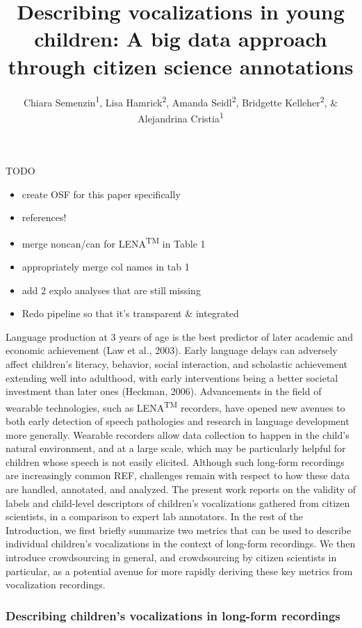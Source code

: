 \documentclass[english,,man,floatsintext]{apa6}
\author{Chiara Semenzin\textsuperscript{1}, Lisa Hamrick\textsuperscript{2}, Amanda Seidl\textsuperscript{2}, Bridgette Kelleher\textsuperscript{2}, \& Alejandrina Cristia\textsuperscript{1}}
\affiliation{
\vspace{0.5cm}
\textsuperscript{1} Laboratoire de Sciences Cognitives et de Psycholinguistique, Département d'Etudes cognitives, ENS, EHESS, CNRS, PSL University\\\textsuperscript{2} Purdue University}
\title{Describing vocalizations in young children: A big data approach through citizen science annotations}
\date{}
\providecommand{\tightlist}{%
  \setlength{\itemsep}{0pt}\setlength{\parskip}{0pt}}
\begin{document}
\maketitle

TODO

\begin{itemize}
\tightlist
\item
  create OSF for this paper specifically
\item
  references!
\item
  merge noncan/can for LENA\textsuperscript{TM} in Table 1
\item
  appropriately merge col names in tab 1
\item
  add 2 explo analyses that are still missing
\item
  Redo pipeline so that it's transparent \& integrated
\end{itemize}

Language production at 3 years of age is the best predictor of later academic and economic achievement (Law et al., 2003). Early language delays can adversely affect children's literacy, behavior, social interaction, and scholastic achievement extending well into adulthood, with early interventions being a better societal investment than later ones (Heckman, 2006). Advancements in the field of wearable technologies, such as LENA\textsuperscript{TM} recorders, have opened new avenues to both early detection of speech pathologies and research in language development more generally. Wearable recorders allow data collection to happen in the child's natural environment, and at a large scale, which may be particularly helpful for children whose speech is not easily elicited. Although such long-form recordings are increasingly common REF, challenges remain with respect to how these data are handled, annotated, and analyzed. The present work reports on the validity of labels and child-level descriptors of children's vocalizations gathered from citizen scientists, in a comparison to expert lab annotators. In the rest of the Introduction, we first briefly summarize two metrics that can be used to describe individual children's vocalizations in the context of long-form recordings. We then introduce crowdsourcing in general, and crowdsourcing by citizen scientists in particular, as a potential avenue for more rapidly deriving these key metrics from vocalization recordings.

\hypertarget{describing-childrens-vocalizations-in-long-form-recordings}{%
\subsubsection{Describing children's vocalizations in long-form recordings}\label{describing-childrens-vocalizations-in-long-form-recordings}}
\end{document}
